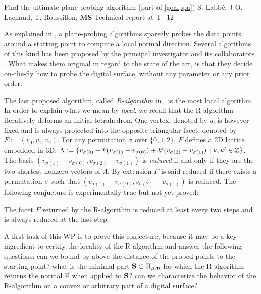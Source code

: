 
   {Find the ultimate plane-probing algorithm (part of \ref{goalppa})}
   {S. Labb\'{e}, J-O. Lachaud, T. Roussillon, \textbf{MS}}
   {Technical report at T+12}
\medskip

As explained in , a plane-probing algorithms sparsely probes the data points
around a starting point to compute a local normal direction. Several algorithms of this kind
has been proposed by the principal investigator and its collaborators
\cite{LPRTCS2016, LPRDGCI2016, LPRJMIV2017}.
What makes them original in regard to the state of the art, is that they decide on-the-fly
how to probe the digital surface, without any parameter or any prior order.

The last proposed algorithm, called \emph{R-algorithm} in \cite{LPRJMIV2017}, is the most
local algorithm. In order to explain what we mean by \emph{local}, we recall that
the R-algorithm iteratively deforms an initial tetrahedron. One vertex, denoted by $q$,
is however fixed and is always projected into the opposite triangular facet, denoted by
$F := (v_0,v_1,v_2)$. For any permutation $\sigma$ over $\{0,1,2\}$, $F$ defines a 2D
lattice embedded in 3D:
$\Lambda := \{ v_{\sigma(0)} + k (v_{\sigma(1)}-v_{\sigma(0)}) + k' (v_{\sigma(2)}-v_{\sigma(1)}) \ | \ k,k' \in {\ensuremath\mathbb{Z}} \}$. 
The basis $(v_{\sigma(1)}-v_{\sigma(0)}, v_{\sigma(2)}-v_{\sigma(1)})$ is \emph{reduced} if and only
if they are the two shortest nonzero vectors of $\Lambda$. By extension $F$ is said reduced
if there exists a permutation $\sigma$ such that $(v_{\sigma(1)}-v_{\sigma(0)}, v_{\sigma(2)}-v_{\sigma(1)})$
is reduced. The following conjucture is experimentally true but not yet proved:

\begin{Conjecture}
  \label{conj:reduction}
  The facet $F$ returned by the R-algorithm is reduced at least every two steps and
  is always reduced at the last step.  
\end{Conjecture}

A first task of this WP is to prove this conjecture, because it may be
a key ingredient to certify the locality of the R-algorithm and answer
the following questions: can we bound by above the distance of the probed
points to the starting point? 
what is the minimal part $\mathbf{S} \subset \Pi_{\mu,\mathbf{n}}$ for which the
R-algorithm returns the normal $\vec{n}$ when applied to $\mathbf{S}$?
can we characterize the behavior of the R-algorithm on a convex or arbitrary
part of a digital surface?

